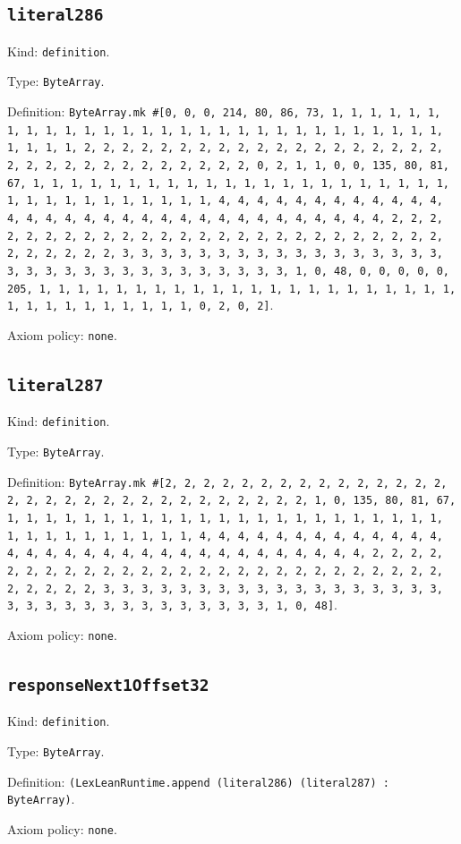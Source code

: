 \documentclass[11pt]{article}
\begin{document}
\subsection*{\texttt{literal286}}
\noindent Kind: \texttt{definition}.\par
\noindent Type: \texttt{ByteArray}.\par
\noindent Definition: \texttt{ByteArray.mk \#[0, 0, 0, 214, 80, 86, 73, 1, 1, 1, 1, 1, 1, 1, 1, 1, 1, 1, 1, 1, 1, 1, 1, 1, 1, 1, 1, 1, 1, 1, 1, 1, 1, 1, 1, 1, 1, 1, 1, 1, 2, 2, 2, 2, 2, 2, 2, 2, 2, 2, 2, 2, 2, 2, 2, 2, 2, 2, 2, 2, 2, 2, 2, 2, 2, 2, 2, 2, 2, 2, 2, 2, 0, 2, 1, 1, 0, 0, 135, 80, 81, 67, 1, 1, 1, 1, 1, 1, 1, 1, 1, 1, 1, 1, 1, 1, 1, 1, 1, 1, 1, 1, 1, 1, 1, 1, 1, 1, 1, 1, 1, 1, 1, 1, 1, 4, 4, 4, 4, 4, 4, 4, 4, 4, 4, 4, 4, 4, 4, 4, 4, 4, 4, 4, 4, 4, 4, 4, 4, 4, 4, 4, 4, 4, 4, 4, 4, 2, 2, 2, 2, 2, 2, 2, 2, 2, 2, 2, 2, 2, 2, 2, 2, 2, 2, 2, 2, 2, 2, 2, 2, 2, 2, 2, 2, 2, 2, 2, 2, 3, 3, 3, 3, 3, 3, 3, 3, 3, 3, 3, 3, 3, 3, 3, 3, 3, 3, 3, 3, 3, 3, 3, 3, 3, 3, 3, 3, 3, 3, 3, 3, 1, 0, 48, 0, 0, 0, 0, 0, 205, 1, 1, 1, 1, 1, 1, 1, 1, 1, 1, 1, 1, 1, 1, 1, 1, 1, 1, 1, 1, 1, 1, 1, 1, 1, 1, 1, 1, 1, 1, 1, 1, 0, 2, 0, 2]}.\par
\noindent Axiom policy: \texttt{none}.\par
\subsection*{\texttt{literal287}}
\noindent Kind: \texttt{definition}.\par
\noindent Type: \texttt{ByteArray}.\par
\noindent Definition: \texttt{ByteArray.mk \#[2, 2, 2, 2, 2, 2, 2, 2, 2, 2, 2, 2, 2, 2, 2, 2, 2, 2, 2, 2, 2, 2, 2, 2, 2, 2, 2, 2, 2, 2, 2, 1, 0, 135, 80, 81, 67, 1, 1, 1, 1, 1, 1, 1, 1, 1, 1, 1, 1, 1, 1, 1, 1, 1, 1, 1, 1, 1, 1, 1, 1, 1, 1, 1, 1, 1, 1, 1, 1, 1, 4, 4, 4, 4, 4, 4, 4, 4, 4, 4, 4, 4, 4, 4, 4, 4, 4, 4, 4, 4, 4, 4, 4, 4, 4, 4, 4, 4, 4, 4, 4, 4, 2, 2, 2, 2, 2, 2, 2, 2, 2, 2, 2, 2, 2, 2, 2, 2, 2, 2, 2, 2, 2, 2, 2, 2, 2, 2, 2, 2, 2, 2, 2, 2, 3, 3, 3, 3, 3, 3, 3, 3, 3, 3, 3, 3, 3, 3, 3, 3, 3, 3, 3, 3, 3, 3, 3, 3, 3, 3, 3, 3, 3, 3, 3, 3, 1, 0, 48]}.\par
\noindent Axiom policy: \texttt{none}.\par
\subsection*{\texttt{responseNext1Offset32}}
\noindent Kind: \texttt{definition}.\par
\noindent Type: \texttt{ByteArray}.\par
\noindent Definition: \texttt{(LexLeanRuntime.append (literal286) (literal287) : ByteArray)}.\par
\noindent Axiom policy: \texttt{none}.\par
\end{document}
